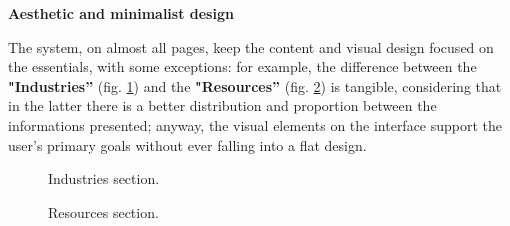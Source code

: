 \textbf{Aesthetic and minimalist design}\par
The system, on almost all pages, keep the content and visual design focused on the essentials, with some exceptions: for example, the difference between the \textbf{"Industries”} (fig. \ref{ind}) and the \textbf{"Resources”} (fig. \ref{res}) is tangible, considering that in the latter there is a better distribution and proportion between the informations presented; anyway, the visual elements on the interface support the user’s primary goals without ever falling into a flat design. 

\begin{figure}[H]
  \centering
    \caption{Industries section.}
    \label{ind}
\end{figure}


\begin{figure}[H]
  \centering
        \caption{Resources section.}
    \label{res}
\end{figure}